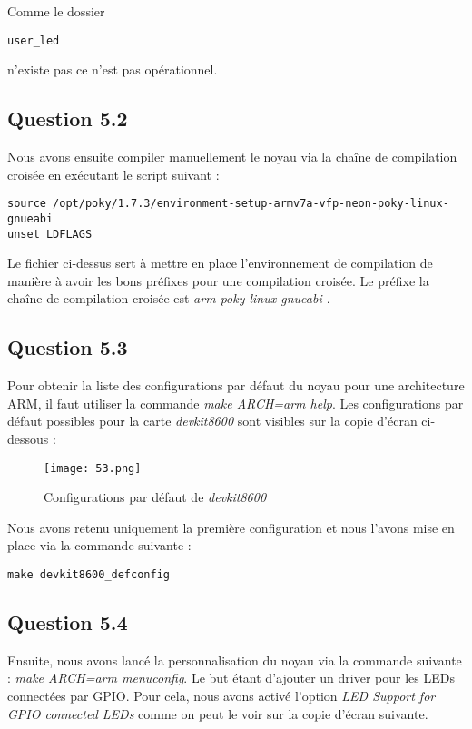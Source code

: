 \documentclass[a4paper,12pt]{report}
\begin{document}
Comme le dossier 
\begin{verbatim} 
user_led 
\end{verbatim} 
n'existe pas ce n'est pas opérationnel.

\subsection{Question 5.2}

Nous avons ensuite compiler manuellement le noyau via la chaîne de compilation croisée en exécutant le script suivant :
\begin{verbatim} 
source /opt/poky/1.7.3/environment-setup-armv7a-vfp-neon-poky-linux-gnueabi
unset LDFLAGS
\end{verbatim} 

Le fichier ci-dessus sert à mettre en place l'environnement de compilation de manière à avoir les bons préfixes pour une compilation croisée.
Le préfixe la chaîne de compilation croisée est \textit{arm-poky-linux-gnueabi-}.

\subsection{Question 5.3}

Pour obtenir la liste des configurations par défaut du noyau pour une architecture ARM, il faut utiliser la commande \textit{make ARCH=arm help}.
Les configurations par défaut possibles pour la carte \textit{devkit8600} sont visibles sur la copie d'écran ci-dessous :

\begin{figure}[h]
	\centering
		\texttt{[image: 53.png]}
		\caption{Configurations par défaut de \textit{devkit8600}}
\end{figure}

Nous avons retenu uniquement la première configuration et nous l'avons mise en place via la commande suivante : 
\begin{verbatim} 
make devkit8600_defconfig
\end{verbatim} 

\subsection{Question 5.4}

Ensuite, nous avons lancé la personnalisation du noyau via la commande suivante : \textit{make ARCH=arm menuconfig}.
Le but étant d'ajouter un driver pour les LEDs connectées par GPIO.
Pour cela, nous avons activé l'option \textit{LED Support for GPIO connected LEDs} comme on peut le voir sur la copie d'écran suivante.
\end{document}
